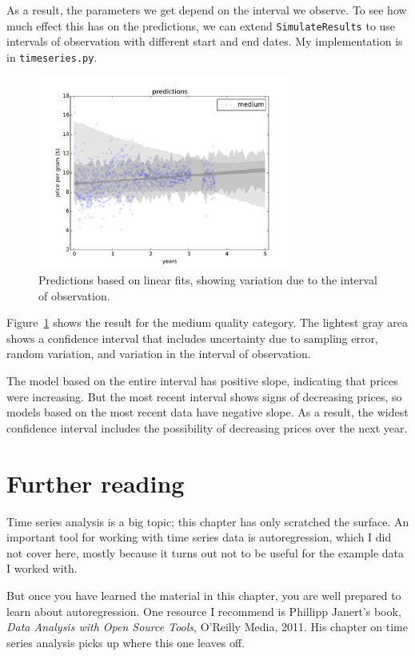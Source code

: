 \documentclass[12pt]{book}
\begin{document}
As a result, the parameters we get depend on the interval we
observe.  To see how much effect this has on the predictions,
we can extend {\tt SimulateResults} to use intervals of observation
with different start and end dates.  My implementation is in
{\tt timeseries.py}.

\begin{figure}
\centerline{\includegraphics[height=2.5in]{figs/timeseries5.pdf}}
\caption{Predictions based on linear fits, showing
variation due to the interval of observation.}
\label{timeseries5}
\end{figure}

Figure~\ref{timeseries5} shows the result for the medium quality
category.  The lightest gray area shows a confidence interval that
includes uncertainty due to sampling error, random variation, and
variation in the interval of observation.

The model based on the entire interval has positive slope, indicating
that prices were increasing.  But the most recent interval shows signs
of decreasing prices, so models based on the most recent data have
negative slope.  As a result, the widest confidence interval includes
the possibility of decreasing prices over the next year.


\section{Further reading}

Time series analysis is a big topic; this chapter has only scratched
the surface.  An important tool for working with time series data
is autoregression, which I did not cover here, mostly because it turns
out not to be useful for the example data I worked with.

But once you
have learned the material in this chapter, you are well prepared
to learn about autoregression.  One resource I recommend is
Phillipp Janert's book, {\it Data Analysis with Open Source Tools},
O'Reilly Media, 2011.  His chapter on time series analysis picks up
where this one leaves off.
\end{document}
